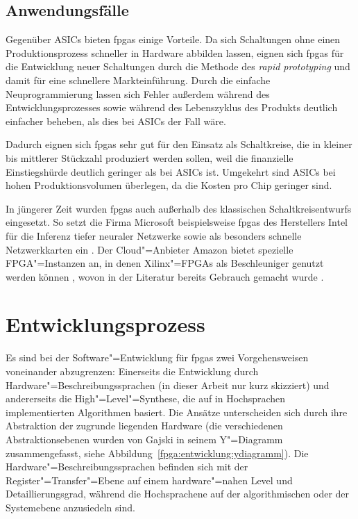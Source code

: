 \subsection{Anwendungsfälle}\label{fpga:ueberblick:anwendungen}

Gegenüber ASICs bieten \gls{fpga}s einige Vorteile. Da sich Schaltungen ohne
einen Produktionsprozess schneller in Hardware abbilden lassen, eignen sich
\gls{fpga}s für die Entwicklung neuer Schaltungen durch die Methode des
\textit{rapid prototyping} und damit für eine schnellere Markteinführung. Durch
die einfache Neuprogrammierung lassen sich Fehler außerdem während des
Entwicklungsprozesses sowie während des Lebenszyklus des Produkts deutlich
einfacher beheben, als dies bei ASICs der Fall wäre.
\cite[vgl.][10-1]{hawkins2010}

Dadurch eignen sich \gls{fpga}s sehr gut für den Einsatz als Schaltkreise, die
in kleiner bis mittlerer Stückzahl produziert werden sollen, weil die
finanzielle Einstiegshürde deutlich geringer als bei ASICs ist. Umgekehrt sind
ASICs bei hohen Produktionsvolumen überlegen, da die Kosten pro Chip geringer
sind.
\cite[vgl.][10-2]{hawkins2010}

In jüngerer Zeit wurden \gls{fpga}s auch außerhalb des klassischen
Schaltkreisentwurfs eingesetzt. So setzt die Firma Microsoft beispielsweise
\gls{fpga}s des Herstellers Intel für die Inferenz tiefer neuraler Netzwerke
\cite[vgl.][]{fowers2018, chung2018} sowie als besonders schnelle
Netzwerkkarten ein \cite[vgl.][]{firestone2018}. Der Cloud"=Anbieter Amazon
bietet spezielle FPGA"=Instanzen an, in denen Xilinx"=FPGAs als Beschleuniger
genutzt werden können \cite[vgl.][]{amazonec2f1}, wovon in der Literatur bereits
Gebrauch gemacht wurde \cite[vgl. z.B.][]{ditucci2017}.

\section{Entwicklungsprozess}\label{fpga:entwicklung}

Es sind bei der Software"=Entwicklung für \gls{fpga}s zwei Vorgehensweisen
voneinander abzugrenzen: Einerseits die Entwicklung durch
Hardware"=Beschreibungssprachen (in dieser Arbeit nur kurz skizziert) und
andererseits die High"=Level"=Synthese, die auf in Hochsprachen implementierten
Algorithmen basiert. Die Ansätze unterscheiden sich durch ihre Abstraktion der
zugrunde liegenden Hardware (die verschiedenen Abstraktionsebenen wurden von
Gajski in seinem Y"=Diagramm zusammengefasst, siehe
Abbildung~\ref{fpga:entwicklung:ydiagramm}). Die Hardware"=Beschreibungssprachen
befinden sich mit der Register"=Transfer"=Ebene auf einem hardware"=nahen Level
und Detaillierungsgrad, während die Hochsprachene auf der algorithmischen
oder der Systemebene anzusiedeln sind. \cite[vgl.][10--11]{kesel2013}

